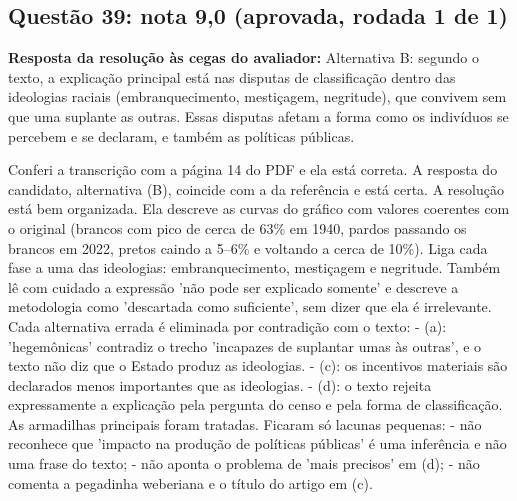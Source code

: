 \documentclass{article}%
\begin{document}
\subsection*{Questão 39: nota 9,0 (aprovada, rodada 1 de 1)}%
\textbf{Resposta da resolução às cegas do avaliador:} Alternativa B: segundo o texto, a explicação principal está nas disputas de classificação dentro das ideologias raciais (embranquecimento, mestiçagem, negritude), que convivem sem que uma suplante as outras. Essas disputas afetam a forma como os indivíduos se percebem e se declaram, e também as políticas públicas.\par %
Conferi a transcrição com a página 14 do PDF e ela está correta. A resposta do candidato, alternativa (B), coincide com a da referência e está certa.\newline%
\newline%
A resolução está bem organizada. Ela descreve as curvas do gráfico com valores coerentes com o original (brancos com pico de cerca de 63\% em 1940, pardos passando os brancos em 2022, pretos caindo a 5--6\% e voltando a cerca de 10\%). Liga cada fase a uma das ideologias: embranquecimento, mestiçagem e negritude. Também lê com cuidado a expressão 'não pode ser explicado somente' e descreve a metodologia como 'descartada como suficiente', sem dizer que ela é irrelevante.\newline%
\newline%
Cada alternativa errada é eliminada por contradição com o texto:\newline%
{-} (a): 'hegemônicas' contradiz o trecho 'incapazes de suplantar umas às outras', e o texto não diz que o Estado produz as ideologias.\newline%
{-} (c): os incentivos materiais são declarados menos importantes que as ideologias.\newline%
{-} (d): o texto rejeita expressamente a explicação pela pergunta do censo e pela forma de classificação.\newline%
\newline%
As armadilhas principais foram tratadas. Ficaram só lacunas pequenas:\newline%
{-} não reconhece que 'impacto na produção de políticas públicas' é uma inferência e não uma frase do texto;\newline%
{-} não aponta o problema de 'mais precisos' em (d);\newline%
{-} não comenta a pegadinha weberiana e o título do artigo em (c).\newline%
\newline%
\end{document}
